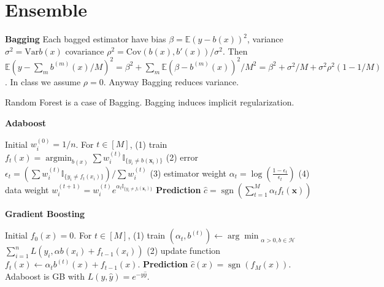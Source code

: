 \section{Ensemble}

\textbf{Bagging} Each bagged estimator have bias $\beta = \mathbb{E}(y-b(x))^2$, variance $\sigma^2 = \text{Var}b(x)$ covariance $\rho^2 = \text{Cov}(b(x),b'(x))/\sigma^2$. Then $\mathbb{E}(y-\sum_m b^{(m)}(x)/M)^2 = \beta^2 + \sum_m \mathbb{E}(\beta-b^{(m)}(x))^2/M^2 = \beta^2 + \sigma^2/M + \sigma^2\rho^2(1-1/M)$. In class we assume $\rho=0$. Anyway Bagging reduces variance.

Random Forest is a case of Bagging. Bagging induces implicit regularization.

\textbf{Adaboost} \begin{footnotesize}
    Initial $w_i^{(0)}=1/n$. For $t\in[M]$, (1) train $f_{t}(x) = \operatorname{argmin}_{b(x)} \sum w_{i}^{(t)} \mathbb{I}_{\{y_{i} \neq b(\mathbf{x}_{i})\}}$ (2) error $\epsilon_{t}=(\sum w_{i}^{(t)} \mathbb{I}_{\{y_{i} \neq f_{t}(x_{i})\}}) / \sum w_{i}^{(t)}$ (3) estimator weight $\alpha_{t}=\log (\frac{1-\epsilon_{t}}{\epsilon_{t}})$ (4) data weight $w_{i}^{(t+1)}=w_{i}^{(t)} e^{\alpha_{t} \mathbb{I}_{\{y_{i} \neq f_{t}(\mathbf{x}_{i})\}}}$ \textbf{Prediction} $\hat{c}=\operatorname{sgn}(\sum_{t=1}^{M} \alpha_{t} f_{t}(\mathbf{x}))$
\end{footnotesize}

\textbf{Gradient Boosting} \begin{footnotesize}
    Initial $f_0(x)=0$. For $t\in[M]$, (1) train $(\alpha_{t}, b^{(t)}) \leftarrow {\arg \min}_{\alpha>0, b \in \mathcal{H}}$ $\sum_{i=1}^{n} L(y_{i}, \alpha b(x_{i})+f_{t-1}(x_{i}))$ (2) update function $f_{t}(x) \leftarrow \alpha_{t} b^{(t)}(x)+f_{t-1}(x)$. \textbf{Prediction} $\hat{c}(x) = \operatorname{sgn}(f_{M}(x))$. Adaboost is GB with $L(y, \hat{y})=e^{-y \hat{y}}$.
\end{footnotesize}


